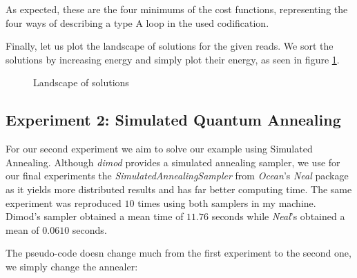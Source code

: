 As expected, these are the four minimums of the cost functions, representing the four ways of describing a type A loop in the used codification.

Finally, let us plot the landscape of solutions for the given reads. We sort the solutions by increasing energy and simply plot their energy, as seen in figure \ref{fig:exp1-landscape}.

\begin{figure}[H]
	\centering
	\caption{Landscape of solutions}
	\label{fig:exp1-landscape}
\end{figure}


\subsection{Experiment 2: Simulated Quantum Annealing}


For our second experiment we aim to solve our example using Simulated Annealing. Although \emph{dimod} provides a simulated annealing sampler, we use for our final experiments the  \emph{SimulatedAnnealingSampler} from \emph{Ocean}'s \emph{Neal} package as it yields more distributed results and has far better computing time. The same experiment was reproduced $10$ times using both samplers in my machine. Dimod's sampler obtained a mean time of $11.76$ seconds while \emph{Neal}'s obtained a mean of $0.0610$ seconds.

The pseudo-code doesn change much from the first experiment to the second one, we simply change the annealer:

